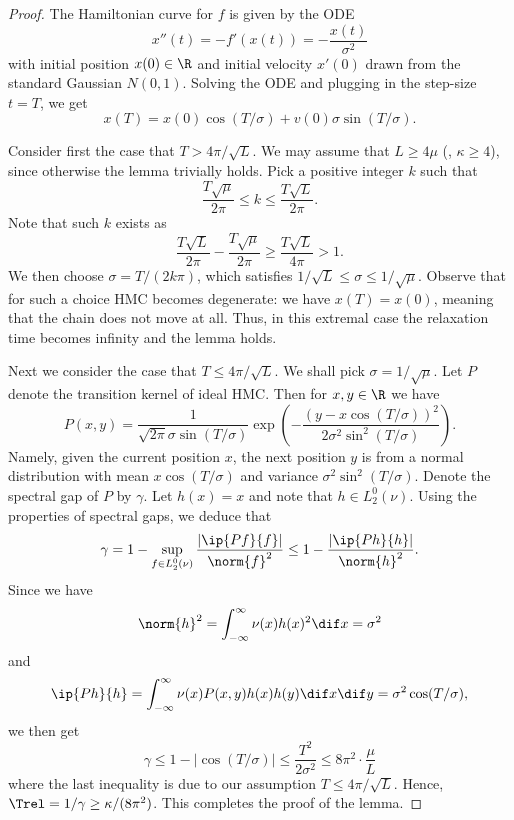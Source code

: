 \begin{proof}
	The Hamiltonian curve for $f$ is given by the ODE
	\[
	x''(t) = - f'(x(t)) = -\frac{x(t)}{\sigma^2}
	\]
	with initial position $x(0) \in \R$ and initial velocity $x'(0)$ drawn from the standard Gaussian $N(0,1)$. 
%
%
%
%
	Solving the ODE and plugging in the step-size $t=T$, we get
	\[
	x(T) = x(0) \cos(T/\sigma) + v(0) \sigma \sin(T/\sigma).
	\]
	
	Consider first the case that $T > 4\pi/\sqrt{L}$. 
	We may assume that $L \ge 4\mu$ (\ie, $\kappa \ge 4$), since otherwise the lemma trivially holds. 
	Pick a positive integer $k$ such that
	\[
	\frac{T\sqrt{\mu}}{2\pi} \le k \le \frac{T\sqrt{L}}{2\pi}.
	\]
	Note that such $k$ exists as
	\[
	\frac{T\sqrt{L}}{2\pi} - \frac{T\sqrt{\mu}}{2\pi} \ge \frac{T\sqrt{L}}{4\pi} > 1.
	\]
	We then choose
	$\sigma = T/(2k\pi)$, 
	which satisfies $1/\sqrt{L} \le \sigma \le 1/\sqrt{\mu}$. 
	Observe that for such a choice HMC becomes degenerate: we have $x(T) = x(0)$, meaning that the chain does not move at all. 
	Thus, in this extremal case the relaxation time becomes infinity and the lemma holds.
	
	Next we consider the case that $T \le 4\pi/\sqrt{L}$.
	We shall pick $\sigma = 1/\sqrt{\mu}$. 
	Let $P$ denote the transition kernel of ideal HMC. 
	Then for $x,y\in\R$ we have
	\[
	P(x,y) = \frac{1}{\sqrt{2\pi} \sigma \sin(T/\sigma)} \exp\left( - \frac{\left( y - x\cos(T/\sigma) \right)^2}{2\sigma^2 \sin^2(T/\sigma)} \right).
	\] 
	Namely, given the current position $x$, the next position $y$ is from a normal distribution with mean $x\cos(T/\sigma)$ and variance $\sigma^2 \sin^2(T/\sigma)$. 
	Denote the spectral gap of $P$ by $\gamma$. 
	Let $h(x) = x$ and note that $h\in L^0_2(\nu)$. Using the properties of spectral gaps, we deduce that
	\[
	\gamma 
	= 1 - \sup_{f\in L_2^0(\nu)} \frac{|\ip{P f}{f}|}{\norm{f}^2}
	\le 1 - \frac{|\ip{P h}{h}|}{\norm{h}^2}. 
	\]
	Since we have
	\[
	\norm{h}^2 = \int_{-\infty}^{\infty} \nu(x) h(x)^2 \dif x = \sigma^2
	\]
	and
	\[
	\ip{P h}{h} = \int_{-\infty}^{\infty} \nu(x) P(x,y) h(x) h(y) \dif x \dif y = \sigma^2 \cos(T/\sigma),
	\]
	we then get 
	\[
	\gamma \le 1 - |\cos(T/\sigma)| 
	\le \frac{T^2}{2\sigma^2} \le 8\pi^2 \cdot \frac{\mu}{L}
	\]
	where the last inequality is due to our assumption $T \le 4\pi/\sqrt{L}$. 
	Hence, $\Trel = 1/\gamma \ge \kappa/(8\pi^2)$. 
	This completes the proof of the lemma. 
\end{proof}

%
%
%
%
%
%
%
%
%
%
%
%
%
%
%
%
%
%
%
%
%
%
%
%
%
%
%
%
%
%
%
%
%
%
%
%
%
%
%
%
%
%
%
%
%
%
%
%
%
%
%
%
%
%
%
%
%
%
%
%
%
%
%
%
%
%
%
%
%
%
%
%
%
%
%
%
%
%
%
%
%
%
%
%
%
%
%






